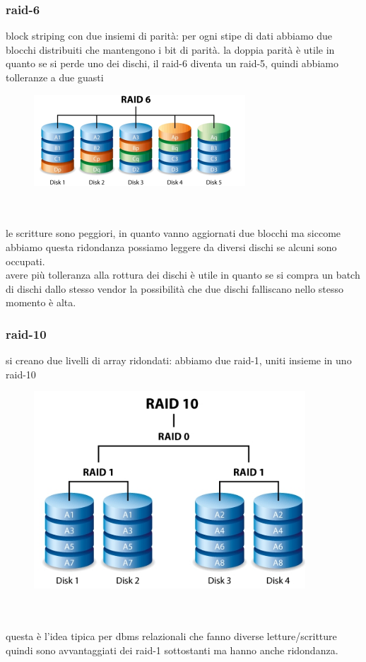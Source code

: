 \documentclass[12pt, oneside]{extbook} %
\begin{document}
\subsubsection{raid-6}
block striping con due insiemi di parità: per ogni stipe di dati abbiamo due blocchi distribuiti che mantengono i bit di parità. la doppia parità è utile in quanto se si perde uno dei dischi, il raid-6 diventa un raid-5, quindi abbiamo tolleranze a due guasti\\
\begin{figure}[!h]
	\includegraphics[scale=0.4]{immagini/raid6.png}
\end{figure}\\\\
le scritture sono peggiori, in quanto vanno aggiornati due blocchi ma siccome abbiamo questa ridondanza possiamo leggere da diversi dischi se alcuni sono occupati.\\avere più tolleranza alla rottura dei dischi è utile in quanto se si compra un batch di dischi dallo stesso vendor la possibilità che due dischi falliscano nello stesso momento è alta.
\subsubsection{raid-10}
si creano due livelli di array ridondati: abbiamo due raid-1, uniti insieme in uno raid-10\\
\begin{figure}[!h]
	\includegraphics[scale=0.4]{immagini/raid10.png}
\end{figure}\\\\
questa è l'idea tipica per dbms relazionali che fanno diverse letture/scritture quindi sono avvantaggiati dei raid-1 sottostanti ma hanno anche ridondanza.
\end{document}
